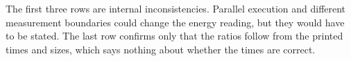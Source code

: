 The first three rows are internal inconsistencies. Parallel execution and different measurement boundaries could change the energy reading, but they would have to be stated. The last row confirms only that the ratios follow from the printed times and sizes, which says nothing about whether the times are correct.
